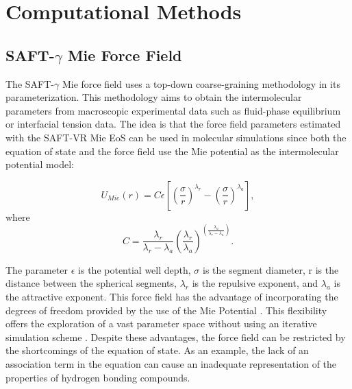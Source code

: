 \documentclass[final,12p,times,twocolumn]{elsarticle}
\begin{document}
	\section{Computational Methods}
	
	\subsection{SAFT-$\gamma$ Mie Force Field}
	
	The SAFT-$\gamma$ Mie force field uses a top-down coarse-graining methodology in its parameterization. This methodology aims to obtain the intermolecular parameters from macroscopic experimental data such as fluid-phase equilibrium or interfacial tension data. The idea is that the force field parameters estimated with the SAFT-VR Mie EoS \cite{lafitte2013} can be used in molecular simulations since both the equation of state and the force field use the Mie potential as the intermolecular potential model:
	
	\begin{equation}
	\label{eqn:miepotential}
	U_{Mie}(r) = C \epsilon  \left[ \left(\frac{\sigma}{r} \right)^{\lambda_r} - \left(\frac{\sigma}{r} \right)^{\lambda_a} \right],
	\end{equation}
	where
	\begin{equation*}
	C = \frac{\lambda_r}{\lambda_r - \lambda_a} \left(\frac{\lambda_r}{\lambda_a} \right)^{\left( \frac{\lambda_a}{\lambda_r - \lambda_a} \right)}.
	\end{equation*}

	The parameter $\epsilon$ is the potential well depth, $\sigma$ is the segment diameter, r is the distance between the spherical segments, $\lambda_r$ is the repulsive exponent, and $\lambda_a$ is the attractive exponent. This force field has the advantage of incorporating the degrees of freedom provided by the use of the Mie Potential \cite{herdes2015}. This flexibility offers the exploration of a vast parameter space without using an iterative simulation scheme \cite{avendano2011}. Despite these advantages, the force field can be restricted by the shortcomings of the equation of state. As an example, the lack of an association term in the equation can cause an inadequate representation of the properties of hydrogen bonding compounds.
	
\end{document}
